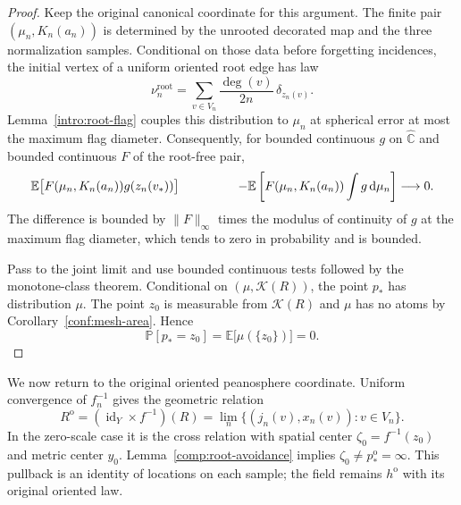 \documentclass[11pt]{article}
\numberwithin{equation}{section}
\theoremstyle{definition}
\theoremstyle{remark}
\newcommand{\PP}{\mathbb P}
\newcommand{\EE}{\mathbb E}
\newcommand{\Chat}{\widehat{\mathbb C}}
\newcommand{\dd}{\mathrm d}
\newcommand{\1}{\mathbf 1}
\DeclareMathOperator{\id}{id}
\begin{document}
\begin{proof}
Keep the original canonical coordinate for this argument.  The
finite pair $(\mu_n,K_n(a_n))$ is determined by the unrooted
decorated map and the three normalization samples.  Conditional
on those data before forgetting incidences, the initial vertex
of a uniform oriented root edge has law
\[
 \nu_n^{\mathrm{root}}
   =\sum_{v\in V_n}\frac{\deg(v)}{2n}\,\delta_{z_n(v)}.
\]
Lemma~\ref{intro:root-flag} couples this distribution to $\mu_n$
at spherical error at most the maximum flag diameter.  Consequently,
for bounded continuous $g$ on $\Chat$ and bounded continuous $F$
of the root-free pair,
\begin{align*}
 &\EE\bigl[F(\mu_n,K_n(a_n))g(z_n(v_*))\bigr]\
 &\hspace{12mm}-
 \EE\left[F(\mu_n,K_n(a_n))\int g\,\dd\mu_n\right]
 \longrightarrow0.
\end{align*}
The difference is bounded by $\|F\|_\infty$ times the modulus of
continuity of $g$ at the maximum flag diameter, which tends to
zero in probability and is bounded.

Pass to the joint limit and use bounded continuous tests followed
by the monotone-class theorem.  Conditional on
$(\mu,\mathcal K(R))$, the point $p_*$ has distribution $\mu$.
The point $z_0$ is measurable from $\mathcal K(R)$ and $\mu$ has
no atoms by Corollary~\ref{conf:mesh-area}.  Hence
\[
 \PP[p_*=z_0]
   =\EE\bigl[\mu(\{z_0\})\bigr]=0.
\]
\end{proof}

We now return to the original oriented peanosphere coordinate.
Uniform convergence of $f_n^{-1}$ gives the geometric relation
\begin{equation}
 \label{comp:oriented-relation}
 R^{\mathrm o}=(\id_Y\times f^{-1})(R)
  =\lim_n\{(j_n(v),x_n(v)):v\in V_n\}.
\end{equation}
In the zero-scale case it is the cross relation with spatial center
$\zeta_0=f^{-1}(z_0)$ and metric center $y_0$.
Lemma~\ref{comp:root-avoidance} implies
$\zeta_0\ne p_*^{\mathrm o}=\infty$.  This pullback is an identity
of locations on each sample; the field remains $h^{\mathrm o}$ with
its original oriented law.
\end{document}
